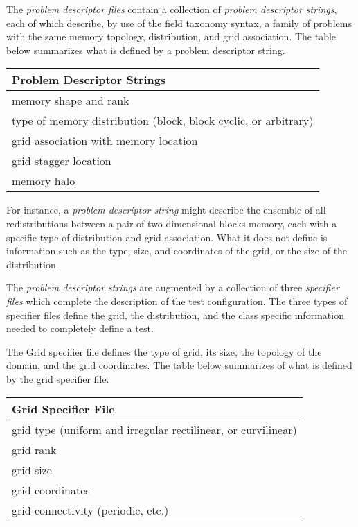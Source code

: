 The \textit{problem descriptor files} contain a collection of \textit{problem descriptor strings}, each of which describe, by use of the field taxonomy syntax, a family of problems with the same memory topology, distribution, and grid association. The table below summarizes what is defined by a problem descriptor string.  
\begin{center}
\begin{tabular}{|l|} \hline \hline
Problem Descriptor Strings \\
\hline
memory shape and rank \\
type of memory distribution (block, block cyclic, or arbitrary) \\
grid association with memory location \\
grid stagger location \\
memory halo \\
\hline
\end{tabular}
\end{center}
For instance, a \textit{problem descriptor string} might describe the ensemble of all redistributions between a pair of two-dimensional blocks memory, each with a specific type of distribution and grid association. What it does not define is information such as the type, size, and coordinates of the grid, or the size of the distribution.

The \textit{problem descriptor strings} are augmented by a collection of three \textit{specifier files} which complete the description of the test configuration. The three types of specifier files define the grid, the distribution, and the class specific information needed to completely define a test.

The Grid specifier file defines the type of grid, its size, the topology of the domain, and the grid coordinates. The table below summarizes of what is defined by the grid specifier file.  
\begin{center}
\begin{tabular}{|l|} \hline \hline
Grid Specifier File \\
\hline
grid type (uniform and irregular rectilinear, or curvilinear) \\
grid rank \\
grid size \\
grid coordinates \\
grid connectivity (periodic, etc.) \\
\hline
\end{tabular}
\end{center}

